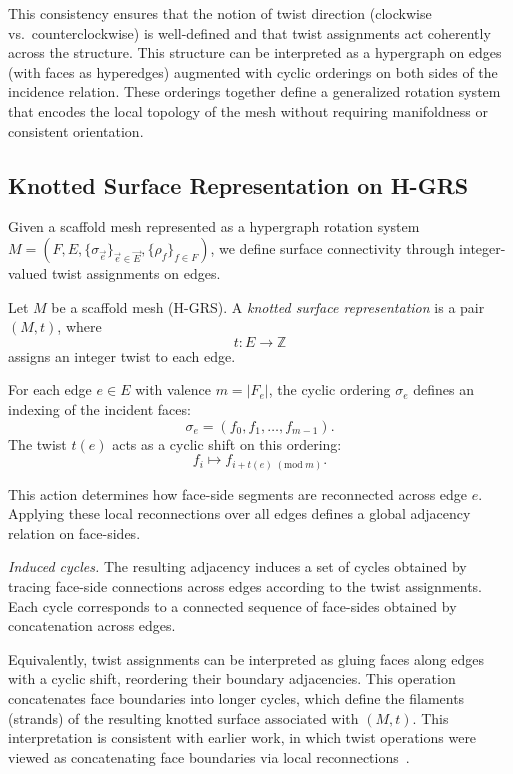 \documentclass[acmtog,anonymous,review]{acmart}
\begin{document}
This consistency ensures that the notion of twist direction
(clockwise vs.\ counterclockwise) is well-defined and that
twist assignments act coherently across the structure.
This structure can be interpreted as a hypergraph on edges (with faces as hyperedges) augmented with cyclic orderings on both sides of the incidence relation. These orderings together define a generalized rotation system that encodes the local topology of the mesh without requiring manifoldness or consistent orientation.



 

\subsection{Knotted Surface Representation on H-GRS}

Given a scaffold mesh represented as a hypergraph rotation system
$M = (F,E,\{\sigma_{\vec e}\}_{\vec e\in \vec E},\{\rho_f\}_{f\in F})$, we define
surface connectivity through integer-valued twist assignments on edges.

\begin{definition}
Let $M$ be a scaffold mesh (H-GRS). A \emph{knotted surface representation}
is a pair $(M, t)$, where
\[
t : E \to \mathbb{Z}
\]
assigns an integer twist to each edge.
\end{definition}



For each edge $e \in E$ with valence $m = |F_e|$, the cyclic ordering
$\sigma_e$ defines an indexing of the incident faces:
\[
\sigma_e = (f_0, f_1, \dots, f_{m-1}).
\]
The twist $t(e)$ acts as a cyclic shift on this ordering:
\[
f_i \mapsto f_{i + t(e) \; (\mathrm{mod}\; m)}.
\]

This action determines how face-side segments are reconnected across edge $e$. Applying these local reconnections over all edges defines a global adjacency relation on face-sides.

\textit{Induced cycles.}
The resulting adjacency induces a set of cycles obtained by tracing face-side connections across edges according to the twist assignments. Each cycle corresponds to a connected sequence of face-sides obtained by concatenation across edges.

Equivalently, twist assignments can be interpreted as gluing faces 
along edges with a cyclic shift, reordering their boundary adjacencies. 
This operation concatenates face boundaries into longer cycles, which 
define the filaments (strands) of the resulting knotted surface associated with $(M, t)$.
This interpretation is consistent with earlier work, in which twist operations were viewed as concatenating face boundaries via local reconnections~\cite{akleman2009cyclic,akleman2015extended,akleman2020topologically,akleman2015block}.
\end{document}

